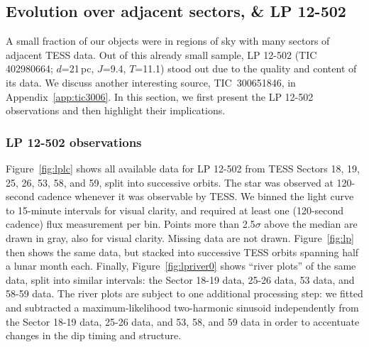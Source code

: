 \documentclass[11pt,twocolumn,tighten]{aastex63}
\begin{document}
\begin{figure*}[!t]
	\begin{center}
		\vspace{-0.2cm}
		
	\end{center}
	\vspace{-0.4cm}
	\caption{
		{\bf River plots of the LP 12-502 light curve}, showing (clockwise
		from top-left) Sectors 18-19, 25-26, 53, and 58-59.  A
		two-harmonic sinusoid has been subtracted to highlight the sharp
		dips.  In Sectors 25-26 (cycles 248-315), periods are visible at
		the fundamental period of 18.5611\,hr, as well as at faster and
		slower relative periods.  For example, at $\phi$$\approx$0.05 and
		$\phi$$\approx$0.3, the various blue ``dips'' have distinct slopes, rather than being
		exactly vertical.  Multiple simultaneous
		periods are also visible in Sectors 53 and 58-59.  White chunks
		denote missing data.
	}
	\label{fig:lpriver0}
\end{figure*}


\subsection{Evolution over adjacent sectors, \& LP 12-502}

A small fraction of our objects were in regions of sky with many
sectors of adjacent TESS data.  Out of this already small sample, LP
12-502 (TIC 402980664; $d$=21\,pc, $J$=9.4, $T$=11.1) stood out due to
the quality and content of its data.  We discuss another interesting
source, TIC~300651846, in Appendix~\ref{app:tic3006}.  In this
section, we first present the LP 12-502 observations and then
highlight their implications.


\subsubsection{LP 12-502 observations}
\label{subsec:lpobservations}

Figure~\ref{fig:lplc} shows all available data for LP 12-502 from TESS
Sectors 18, 19, 25, 26, 53, 58, and 59, split into successive orbits.
The star was observed at 120-second cadence whenever it was observable
by TESS.  We binned the light curve to 15-minute intervals for visual
clarity, and required at least one (120-second cadence) flux
measurement per bin.  Points more than 2.5$\sigma$ above the median
are drawn in gray, also for visual clarity.  Missing data are not
drawn.  Figure~\ref{fig:lp} then shows the same data, but stacked into
successive TESS orbits spanning half a lunar month each.  Finally,
Figure~\ref{fig:lpriver0} shows ``river plots'' of the same data,
split into similar intervals: the Sector 18-19 data, 25-26 data, 53
data, and 58-59 data.  The river plots are subject to one additional
processing step: we fitted and subtracted a maximum-likelihood
two-harmonic sinusoid independently from the Sector 18-19 data, 25-26
data, and 53, 58, and 59 data in order to accentuate changes in the
dip timing and structure.
\end{document}
